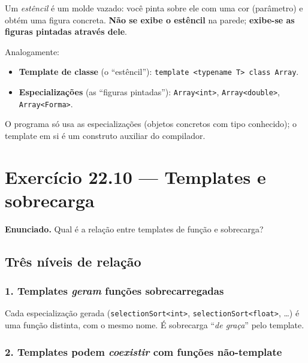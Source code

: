 \documentclass[11pt,a4paper]{article}
\begin{document}
Um \emph{est\^encil} \'e um molde vazado: voc\^e pinta sobre ele com uma cor (par\^ametro) e obt\'em uma figura concreta. \textbf{N\~ao se exibe o est\^encil} na parede; \textbf{exibe-se as figuras pintadas atrav\'es dele}.

Analogamente:

\begin{itemize}[leftmargin=*,itemsep=0pt]
  \item \textbf{Template de classe} (o ``est\^encil''): \texttt{template <typename T> class Array}.
  \item \textbf{Especializa\c{c}\~oes} (as ``figuras pintadas''): \texttt{Array<int>}, \texttt{Array<double>}, \texttt{Array<Forma>}.
\end{itemize}

O programa s\'o usa as especializa\c{c}\~oes (objetos concretos com tipo conhecido); o template em si \'e um construto auxiliar do compilador.

\section{Exerc\'icio 22.10 --- Templates e sobrecarga}

\begin{enunciado}
\textbf{Enunciado.} Qual \'e a rela\c{c}\~ao entre templates de fun\c{c}\~ao e sobrecarga?
\end{enunciado}

\subsection*{Tr\^es n\'iveis de rela\c{c}\~ao}

\subsubsection*{1. Templates \emph{geram} fun\c{c}\~oes sobrecarregadas}

Cada especializa\c{c}\~ao gerada (\texttt{selectionSort<int>}, \texttt{selectionSort<float>}, \ldots) \'e uma fun\c{c}\~ao distinta, com o mesmo nome. \'E sobrecarga ``\emph{de gra\c{c}a}'' pelo template.

\subsubsection*{2. Templates podem \emph{coexistir} com fun\c{c}\~oes n\~ao-template}
\end{document}
